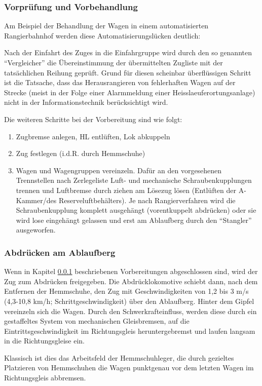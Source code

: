 \subsubsection{Vorprüfung und Vorbehandlung}\label{sec:Vorpruefung}
Am Beispiel der Behandlung der Wagen in einem automatisierten \gls{Rangierbahnhof} werden diese Automatisierungslücken deutlich:\par
Nach der Einfahrt des Zuges in die Einfahrgruppe wird durch den so genannten "`Vergleicher"' die Übereinstimmung der übermittelten Zugliste mit der tatsächlichen Reihung geprüft. Grund für diesen scheinbar überflüssigen Schritt ist die Tatsache, dass das Herausrangieren von fehlerhaften Wagen auf der Strecke (meist in der Folge einer Alarmmeldung einer \gls{Heisslaeuferortungsanlage}) nicht in der Informationstechnik berücksichtigt wird.\par
Die weiteren Schritte bei der Vorbereitung sind wie folgt:
\begin{enumerate}
    \item Zugbremse anlegen, \acrshort{HL} entlüften, Lok abkuppeln
    \item Zug festlegen (i.d.R. durch \gls{Hemmschuh}e)
    \item Wagen und Wagengruppen vereinzeln. Dafür an den vorgesehenen Trennstellen nach Zerlegeliste Luft- und mechanische Schraubenkupplungen trennen und Luftbremse durch ziehen am Lösezug lösen (Entlüften der A-Kammer/des Reserveluftbehälters). Je nach Rangierverfahren wird die Schraubenkupplung komplett ausgehängt (vorentkuppelt abdrücken) oder sie wird lose eingehängt gelassen und erst am \gls{Ablaufberg} durch den "`Stangler"' ausgeworfen.
\end{enumerate}
\subsubsection{Abdrücken am Ablaufberg}\label{sec:Abdruecken}
Wenn in Kapitel \ref{sec:Vorpruefung} beschriebenen Vorbereitungen abgeschlossen sind, wird der Zug zum Abdrücken freigegeben. Die Abdrücklokomotive schiebt dann, nach dem Entfernen der Hemmschuhe, den Zug mit Geschwindigkeiten von 1,2 bis 3 m/s (4,3-10,8 km/h; Schrittgeschwindigkeit) %
über den \gls{Ablaufberg}. Hinter dem Gipfel vereinzeln sich die Wagen. Durch den Schwerkrafteinfluss, werden diese durch ein gestaffeltes System von mechanischen Gleisbremsen, auf die Eintrittsgeschwindigkeit im Richtungsgleis heruntergebremst und laufen langsam in die Richtungsgleise ein.\par
Klassisch ist dies das Arbeitsfeld der Hemmschuhleger, die durch gezieltes Platzieren von Hemmschuhen die Wagen punktgenau vor dem letzten Wagen im Richtungsgleis abbremsen.
